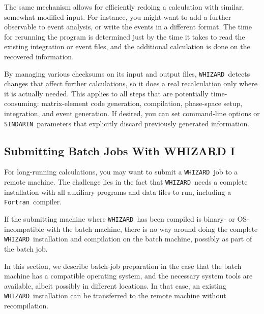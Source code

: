\documentclass[12pt]{book}
\newcommand{\whizard}{\texttt{WHIZARD}}
\newcommand{\sindarin}{\texttt{SINDARIN}}
\newcommand{\fortran}{\texttt{Fortran}}
\begin{document}
The same mechanism allows for efficiently redoing a calculation with
similar, somewhat modified input.  For instance, you might want to add
a further observable to event analysis, or write the events in a
different format.  The time for rerunning the program is determined
just by the time it takes to read the existing integration or event
files, and the additional calculation is done on the recovered
information.

By managing various checksums on its input and output files, \whizard\
detects changes that affect further calculations, so it does a
real recalculation only where it is actually needed.  This applies to
all steps that are potentially time-consuming: matrix-element code
generation, compilation, phase-space setup, integration, and event
generation.  If desired, you can set command-line options or
\sindarin\ parameters that explicitly discard previously generated
information.



\subsection{Submitting Batch Jobs With WHIZARD I}
\label{sec:batch}

For long-running calculations, you may want to submit a \whizard\ job
to a remote machine.  The challenge lies in the fact that \whizard\
needs a complete installation with all auxiliary programs and data
files to run, including a \fortran\ compiler.

If the submitting machine where \whizard\ has been compiled is binary-
or OS-incompatible with the batch machine, there is no way around
doing the complete \whizard\ installation and compilation on the batch
machine, possibly as part of the batch job.

In this section, we describe batch-job preparation in the case that
the batch machine has a compatible operating system, and the necessary
system tools are available, albeit possibly in different locations.
In that case, an existing \whizard\ installation can be transferred to
the remote machine without recompilation.
\end{document}

